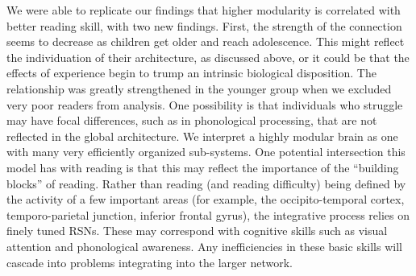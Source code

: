 We were able to replicate our findings that higher modularity is correlated with better reading skill, with two new findings. First, the strength of the connection seems to decrease as children get older and reach adolescence. This might reflect the individuation of their architecture, as discussed above, or it could be that the effects of experience begin to trump an intrinsic biological disposition. The relationship was greatly strengthened in the younger group when we excluded very poor readers from analysis. One possibility is that individuals who struggle may have focal differences, such as in phonological processing, that are not reflected in the global architecture. We interpret a highly modular brain as one with many very efficiently organized sub-systems. One potential intersection this model has with reading is that this may reflect the importance of the ``building blocks'' of reading. Rather than reading (and reading difficulty) being defined by the activity of a few important areas (for example, the occipito-temporal cortex, temporo-parietal junction, inferior frontal gyrus), the integrative process relies on finely tuned RSNs. These may correspond with cognitive skills such as visual attention and phonological awareness. Any inefficiencies in these basic skills will cascade into problems integrating into the larger network.